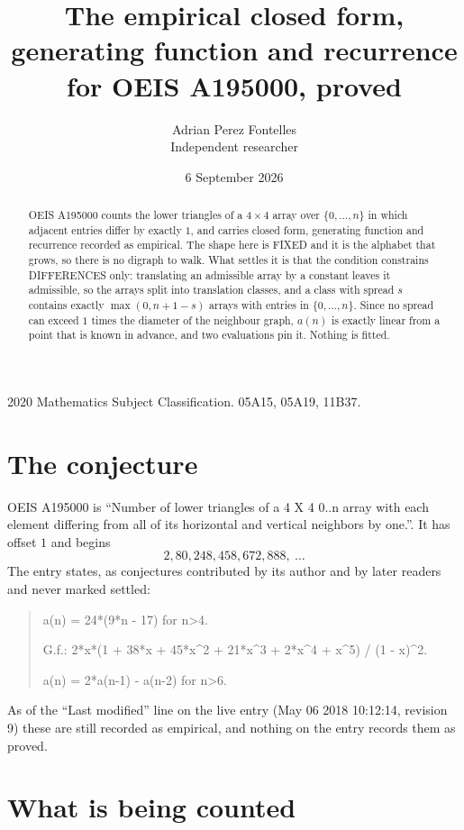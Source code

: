 \documentclass[11pt,a4paper]{article}
\title{The empirical closed form, generating function and recurrence for OEIS A195000, proved}
\author{Adrian Perez Fontelles\\ \small Independent researcher}
\date{6 September 2026}
\theoremstyle{plain}
\theoremstyle{definition}
\begin{document}
\maketitle

\begin{abstract}
OEIS A195000 counts the lower triangles of a $4\times4$ array over $\{0,\dots,n\}$ in which
adjacent entries differ by exactly $1$, and carries closed form, generating function and recurrence recorded as empirical. The shape here is FIXED
and it is the alphabet that grows, so there is no digraph to walk. What settles it is that the
condition constrains DIFFERENCES only: translating an admissible array by a constant leaves it
admissible, so the arrays split into translation classes, and a class with spread $s$ contains
exactly $\max(0,n+1-s)$ arrays with entries in $\{0,\dots,n\}$. Since no spread can exceed
$1$ times the diameter of the neighbour graph, $a(n)$ is exactly linear from a point that is
known in advance, and two evaluations pin it. Nothing is fitted.
\end{abstract}

\noindent\small 2020 Mathematics Subject Classification. 05A15, 05A19, 11B37.\normalsize

\section{The conjecture}

OEIS A195000 is ``Number of lower triangles of a 4 X 4 0..n array with each element differing from all of its horizontal and vertical neighbors by one.''. It has offset $1$ and begins
\[
2, 80, 248, 458, 672, 888,\ \dots
\]
The entry states, as conjectures contributed by its author and by later readers and never
marked settled:
\begin{quote}
a(n) = 24*(9*n - 17) for n>4.

G.f.: 2*x*(1 + 38*x + 45*x\^{}2 + 21*x\^{}3 + 2*x\^{}4 + x\^{}5) / (1 - x)\^{}2.

a(n) = 2*a(n-1) - a(n-2) for n>6.
\end{quote}
As of the ``Last modified'' line on the live entry (May 06 2018 10:12:14, revision 9) these are still
recorded as empirical, and nothing on the entry records them as proved.

\section{What is being counted}
\end{document}
